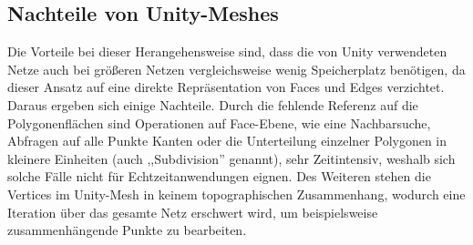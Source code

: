 \subsection{Nachteile von Unity-Meshes}
Die Vorteile bei dieser Herangehensweise sind, dass die von Unity verwendeten Netze auch bei gr\"o{\ss}eren Netzen vergleichsweise wenig Speicherplatz ben\"otigen, da dieser Ansatz auf eine direkte Repr\"asentation von Faces und Edges verzichtet. Daraus ergeben sich einige Nachteile. Durch die fehlende Referenz auf die Polygonenfl\"achen sind Operationen auf Face-Ebene, wie eine Nachbarsuche, Abfragen auf alle Punkte Kanten oder die Unterteilung einzelner Polygonen in kleinere Einheiten (auch ,,Subdivision'' genannt), sehr Zeitintensiv, weshalb sich solche F\"alle nicht f\"ur Echtzeitanwendungen eignen. Des Weiteren stehen die Vertices im Unity-Mesh in keinem topographischen Zusammenhang, wodurch eine Iteration \"uber das gesamte Netz erschwert wird, um beispielsweise zusammenh\"angende Punkte zu bearbeiten.
